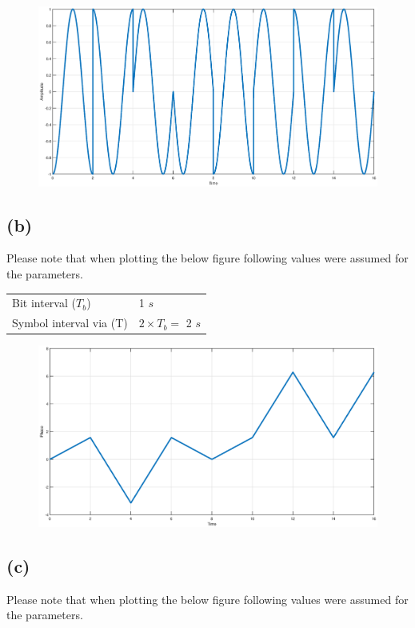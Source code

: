 \documentclass[a4paper,11pt]{article}%
\begin{document}
\begin{figure}[!h]
	\includegraphics[scale=0.4]{figures/fig4a}
\end{figure}

\pagebreak
\subsection*{(b)}
Please note that when plotting the below figure following values were assumed for the parameters.\\

\begin{tabular}{l l}
	Bit interval ($T_b$) & 1 $s$ \\
	Symbol interval via (T) &$2 \times T_b = $  2 $s$
\end{tabular}

\begin{figure}[!h]
	\includegraphics[scale=0.4]{figures/fig4b}
\end{figure}

\pagebreak
\subsection*{(c)}
Please note that when plotting the below figure following values were assumed for the parameters.\\
\end{document}
